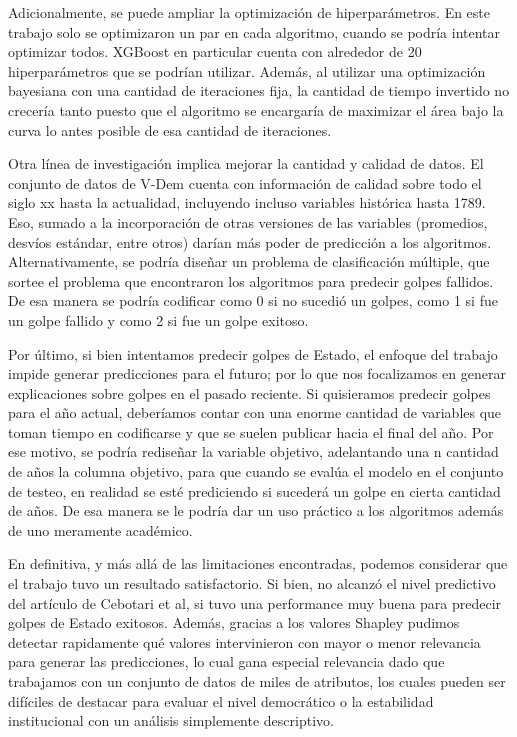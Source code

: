 \documentclass{article}
\begin{document}
Adicionalmente, se puede ampliar la optimización de hiperparámetros. En este trabajo solo se optimizaron
un par en cada algoritmo, cuando se podría intentar optimizar todos. XGBoost en particular cuenta con alrededor
de 20 hiperparámetros que se podrían utilizar. Además, al utilizar una optimización bayesiana con una cantidad
de iteraciones fija, la cantidad de tiempo invertido no crecería tanto puesto que el algoritmo se encargaría
de maximizar el área bajo la curva lo antes posible de esa cantidad de iteraciones.

Otra línea de investigación implica mejorar la cantidad y calidad de datos. El conjunto de datos de V-Dem
cuenta con información de calidad sobre todo el siglo xx hasta la actualidad, incluyendo incluso variables
histórica hasta 1789. Eso, sumado a la incorporación de otras versiones de las variables (promedios,
desvíos estándar, entre otros) darían más poder de predicción a los algoritmos. Alternativamente, se podría
diseñar un problema de clasificación múltiple, que sortee el problema que encontraron los algoritmos para 
predecir golpes fallidos. De esa manera se podría codificar como 0 si no sucedió un golpes, como 1 si fue un
golpe fallido y como 2 si fue un golpe exitoso.

Por último, si bien intentamos predecir golpes de Estado, el enfoque del trabajo impide generar
predicciones para el futuro; por lo que nos focalizamos en generar explicaciones sobre golpes en el
pasado reciente. Si quisieramos predecir golpes para el año actual, deberíamos contar con 
una enorme cantidad de variables que toman tiempo en codificarse y que se suelen publicar hacia el final del
año. Por ese motivo, se podría rediseñar la variable objetivo, adelantando una n cantidad de años la columna
objetivo, para que cuando se evalúa el modelo en el conjunto de testeo, en realidad se esté prediciendo
si sucederá un golpe en cierta cantidad de años. De esa manera se le podría dar un uso práctico a los
algoritmos además de uno meramente académico.

En definitiva, y más allá de las limitaciones encontradas, podemos considerar que el trabajo tuvo un resultado
satisfactorio. Si bien, no alcanzó el nivel predictivo del artículo de Cebotari et al, si tuvo una performance
muy buena para predecir golpes de Estado exitosos. Además, gracias a los valores Shapley pudimos detectar
rapidamente qué valores intervinieron con mayor o menor relevancia para generar las predicciones, lo cual
gana especial relevancia dado que trabajamos con un conjunto de datos de miles de atributos, los cuales pueden
ser difíciles de destacar para evaluar el nivel democrático o la estabilidad institucional con un análisis
simplemente descriptivo.
\end{document}
